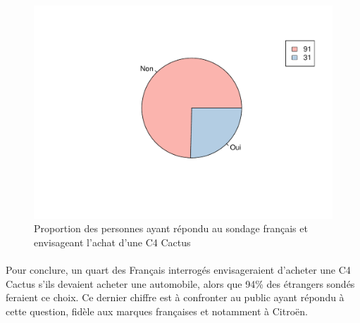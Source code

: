 \documentclass[12pt]{article}\usepackage[]{graphicx}\usepackage[]{color}
\makeatletter
\def\maxwidth{ %
  \ifdim\Gin@nat@width>\linewidth
    \linewidth
  \else
    \Gin@nat@width
  \fi
}
\newenvironment{knitrout}{}{} %
\makeatother
\begin{document}
\begin{knitrout}
\color{fgcolor}\begin{figure}[H]
\includegraphics[width=\maxwidth]{figure/buy_fr-1} \caption[Proportion des personnes ayant répondu au sondage français et envisageant l'achat d'une C4 Cactus]{Proportion des personnes ayant répondu au sondage français et envisageant l'achat d'une C4 Cactus}\label{fig:buy fr}
\end{figure}


\end{knitrout}

%
%

\paragraph{} Pour conclure, un quart des Français
interrogés envisageraient d'acheter une C4 Cactus s'ils devaient acheter une automobile, alors
que 94\% des étrangers sondés feraient ce choix. Ce dernier chiffre est à confronter
au public ayant répondu à cette question, fidèle aux marques françaises et notamment à Citroën.
\end{document}

